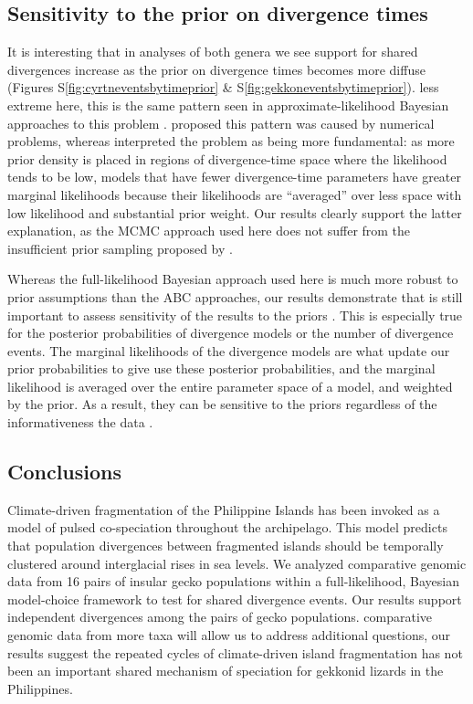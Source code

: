 \subsection{Sensitivity to the prior on divergence times}

It is interesting that in analyses of both genera we see support for shared
divergences increase as the prior on divergence times becomes more diffuse
(Figures
S\ref{fig:cyrtneventsbytimeprior}
\&
S\ref{fig:gekkoneventsbytimeprior}).
 less extreme here, this is the same pattern seen in
approximate-likelihood Bayesian approaches to this problem
\citep{Oaks2012,Hickerson2013,Oaks2014reply}.
\citet{Hickerson2013} proposed this pattern was caused by numerical problems,
whereas \citet{Oaks2014reply} interpreted the problem as being more
fundamental:
as more prior density is placed in regions of divergence-time space where the
likelihood tends to be low, models that have fewer divergence-time parameters
have greater marginal likelihoods because their likelihoods are ``averaged''
over less space with low likelihood and substantial prior weight.
Our results clearly support the latter explanation, as the MCMC approach used
here does not suffer from the insufficient prior sampling proposed by
\citet{Hickerson2013}.

Whereas the full-likelihood Bayesian approach used here is much more robust to
prior assumptions than the ABC approaches, our results demonstrate that is
still important to assess sensitivity of the results to the priors
\citep{Oaks2012}.
This is especially true for the posterior probabilities of divergence models or
the number of divergence events.
The marginal likelihoods of the divergence models are what update our prior
probabilities to give use these posterior probabilities, and the marginal
likelihood is averaged over the entire parameter space of a model, and weighted
by the prior.
As a result, they can be sensitive to the priors regardless of the
informativeness the data \citep{Oaks2018marginal}.

\subsection{Conclusions}
Climate-driven fragmentation of the Philippine Islands has been invoked as a
model of pulsed co-speciation throughout the archipelago.
This model predicts that population divergences between fragmented islands
should be temporally clustered around interglacial rises in sea levels.
We analyzed comparative genomic data from 16 pairs of insular gecko populations
within a full-likelihood, Bayesian model-choice framework to test for shared
divergence events.
Our results support independent divergences among the pairs of gecko
populations.
 comparative genomic data from more taxa will allow us to address
additional questions, our results suggest the repeated cycles of climate-driven
island fragmentation has not been an important shared mechanism of speciation
for gekkonid lizards in the Philippines.
